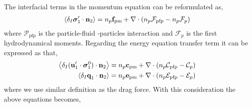 The interfacial terms in the momentum equation can be reformulated as,
\begin{align*}
    \left<\delta_I \bm{\sigma}_1' \cdot \textbf{n}_2\right>
    = n_p \textbf{f}_\text{pm} + \mathbf{\nabla}\cdot (n_p \mathcal{F}_\text{pfp} - n_p \mathcal{F}_p)
\end{align*}
where $\mathcal{P}_\text{pfp}$ is the particle-fluid -particles interaction and $\mathcal{F}_p$ is the first hydrodynamical moments.
Regarding the energy equation transfer term it can be expressed as that,  
\begin{align*}
    \left<\delta_I (\textbf{u}_1' \cdot \bm{\sigma}_1^0)\cdot \textbf{n}_2\right>
    = n_p \textbf{c}_\text{pm} + \mathbf{\nabla}\cdot (n_p \mathcal{C}_\text{pfp} - \mathcal{C}_p)\\
    \left<\delta_I \textbf{q}_1 \cdot \textbf{n}_2\right>
    = n_p \textbf{e}_\text{pm} + \mathbf{\nabla}\cdot (n_p \mathcal{E}_\text{pfp} - \mathcal{E}_p)
\end{align*}
where we use similar definition as the drag force. 
With this consideration the above equations becomes, 

